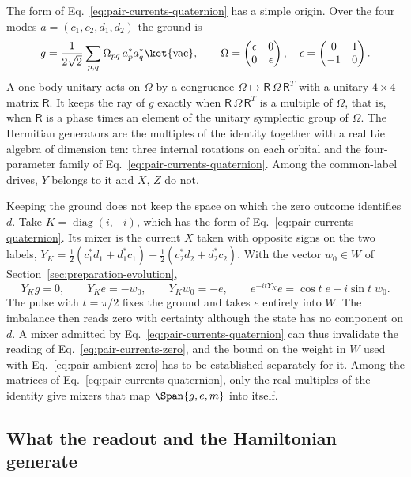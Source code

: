 The form of Eq.~\eqref{eq:pair-currents-quaternion} has a simple origin. Over the four modes $a=(c_1,c_2,d_1,d_2)$ the ground is
\[
 g=\frac1{2\sqrt2}\sum_{p,q}\Omega_{pq}\,a_p^*a_q^*\ket{\mathrm{vac}},\qquad
 \Omega=\begin{pmatrix}\epsilon&0\\0&\epsilon\end{pmatrix},\quad
 \epsilon=\begin{pmatrix}0&1\\-1&0\end{pmatrix}.
\]
A one-body unitary acts on $\Omega$ by a congruence $\Omega\mapsto\mathsf R\,\Omega\,\mathsf R^T$ with a unitary $4\times4$ matrix $\mathsf R$. It keeps the ray of $g$ exactly when $\mathsf R\,\Omega\,\mathsf R^T$ is a multiple of $\Omega$, that is, when $\mathsf R$ is a phase times an element of the unitary symplectic group of $\Omega$. The Hermitian generators are the multiples of the identity together with a real Lie algebra of dimension ten: three internal rotations on each orbital and the four-parameter family of Eq.~\eqref{eq:pair-currents-quaternion}. Among the common-label drives, $Y$ belongs to it and $X$, $Z$ do not.

Keeping the ground does not keep the space on which the zero outcome identifies $d$. Take $K=\operatorname{diag}(i,-i)$, which has the form of Eq.~\eqref{eq:pair-currents-quaternion}. Its mixer is the current $X$ taken with opposite signs on the two labels, $Y_K=\tfrac12(c_1^*d_1+d_1^*c_1)-\tfrac12(c_2^*d_2+d_2^*c_2)$. With the vector $w_0\in W$ of Section~\ref{sec:preparation-evolution},
\begin{equation}
 Y_Kg=0,\qquad Y_Ke=-w_0,\qquad Y_Kw_0=-e,\qquad e^{-itY_K}e=\cos t\;e+i\sin t\;w_0 .
 \label{eq:pair-currents-leaving}
\end{equation}
The pulse with $t=\pi/2$ fixes the ground and takes $e$ entirely into $W$. The imbalance then reads zero with certainty although the state has no component on $d$. A mixer admitted by Eq.~\eqref{eq:pair-currents-quaternion} can thus invalidate the reading of Eq.~\eqref{eq:pair-currents-zero}, and the bound on the weight in $W$ used with Eq.~\eqref{eq:pair-ambient-zero} has to be established separately for it. Among the matrices of Eq.~\eqref{eq:pair-currents-quaternion}, only the real multiples of the identity give mixers that map $\Span\{g,e,m\}$ into itself.

\subsection{What the readout and the Hamiltonian generate}
\label{subsec:pair-currents-algebras}

